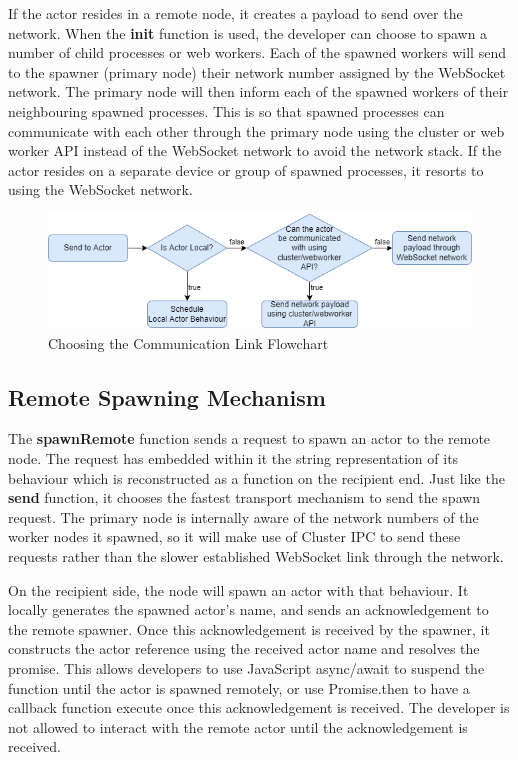 \documentclass[12pt, a4paper]{report}
\theoremstyle{definition}
\theoremstyle{definition}%
\theoremstyle{definition}%
\theoremstyle{definition}%
\theoremstyle{definition}%
\theoremstyle{definition}%
\begin{document}
If the actor resides in a remote node, it creates a payload to send over the network. When the \textbf{init} function is used, the developer can choose to spawn a number of child processes or web workers. Each of the spawned workers will send to the spawner (primary node) their network number assigned by the WebSocket network. The primary node will then inform each of the spawned workers of their neighbouring spawned processes. This is so that spawned processes can communicate with each other through the primary node using the cluster or web worker API instead of the WebSocket network to avoid the network stack. If the actor resides on a separate device or group of spawned processes, it resorts to using the WebSocket network.
\begin{figure}[H]
    \begin{centering}
        \includegraphics[width=\textwidth]{resources/communication.png}
        \caption{Choosing the Communication Link Flowchart}
    \end{centering}
\end{figure}
\subsection{Remote Spawning Mechanism}
The \textbf{spawnRemote} function sends a request to spawn an actor to the remote node. The request has embedded within it the string representation of its behaviour which is reconstructed as a function on the recipient end. Just like the \textbf{send} function, it chooses the fastest transport mechanism to send the spawn request. The primary node is internally aware of the network numbers of the worker nodes it spawned, so it will make use of Cluster IPC to send these requests rather than the slower established WebSocket link through the network.

On the recipient side, the node will spawn an actor with that behaviour. It locally generates the spawned actor's name, and sends an acknowledgement to the remote spawner. Once this acknowledgement is received by the spawner, it constructs the actor reference using the received actor name and resolves the promise. This allows developers to use JavaScript async/await to suspend the function until the actor is spawned remotely, or use Promise.then to have a callback function execute once this acknowledgement is received. The developer is not allowed to interact with the remote actor until the acknowledgement is received. 
\end{document}

